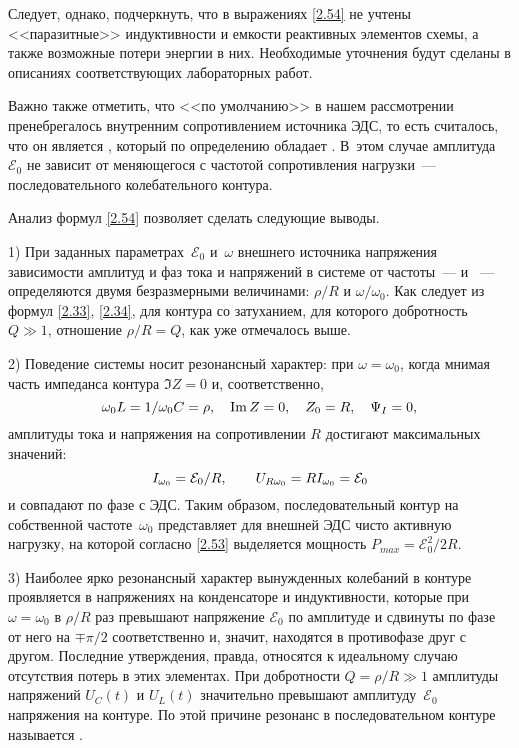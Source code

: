 \documentclass[a4paper,oneside]{book}
\begin{document}
Следует, однако, подчеркнуть, что в выражениях \eqref{2.54} не учтены
<<паразитные>> индуктивности и емкости реактивных элементов схемы, а также
возможные потери энергии в них. Необходимые уточнения будут сделаны в описаниях
соответствующих лабораторных работ.

Важно также отметить, что <<по умолчанию>> в нашем рассмотрении пренебрегалось
внутренним сопротивлением источника ЭДС, то есть считалось, что он является
, который по определению обладает
. В~этом случае амплитуда
$\mathcal{E}_0$ не зависит от меняющегося с частотой сопротивления
нагрузки~--- последовательного колебательного контура.

Анализ формул \eqref{2.54} позволяет сделать следующие выводы.

1) При заданных параметрах~$\mathcal{E}_0$ и~$\omega$ внешнего источника
напряжения зависимости амплитуд и фаз тока и напряжений в системе от
частоты~---  и ~--- определяются двумя безразмерными величинами: $\rho/R$ и
$\omega/\omega_0$. Как следует из формул \eqref{2.33}, \eqref{2.34}, для контура
со  затуханием, для которого добротность $Q\gg1$, отношение
$\rho/R=Q$, как уже отмечалось выше.

2) Поведение системы носит резонансный характер: при $\omega=\omega_0$, когда
мнимая часть импеданса контура $\Im Z=0$ и, соответственно,
\begin{equation}\eqmark{2.55}
	\omega_0L=1/\omega_0C=\rho, \quad \Im Z=0, \quad Z_0 = R, \quad \Psi_I = 0,
\end{equation}
амплитуды тока и напряжения на сопротивлении $R$ достигают максимальных значений:
\begin{equation}\eqmark{2.56}
	I_{\omega_0}=\mathcal{E}_0/R, \qquad
U_{R\omega_0}=RI_{\omega_0}=\mathcal{E}_0
\end{equation}
и совпадают по фазе с ЭДС. Таким образом, последовательный
контур на собственной частоте~$\omega_0$ представляет для внешней ЭДС чисто
активную нагрузку, на которой согласно \eqref{2.53} выделяется мощность
$P_{max}=\mathcal{E}_0^2/2R$.

3) Наиболее ярко резонансный характер вынужденных колебаний в
 контуре проявляется в напряжениях на конденсаторе и
индуктивности, которые при $\omega=\omega_0$ в $\rho/R$ раз превышают напряжение
$\mathcal{E}_0$ по амплитуде и сдвинуты по фазе от него на $\mp\pi/2$
соответственно и, значит, находятся в противофазе друг с другом. Последние
утверждения, правда, относятся к идеальному случаю отсутствия потерь в этих
элементах. При добротности $Q=\rho/R\gg1$ амплитуды напряжений $U_C(t)$ и
$U_L(t)$ значительно превышают амплитуду~$\mathcal{E}_0$ напряжения на контуре.
По этой причине резонанс в последовательном контуре называется
.
\end{document}
